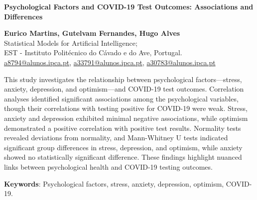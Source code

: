 \documentclass[a4paper]{article}
\begin{document}
\noindent
\textbf{Psychological Factors and COVID-19 Test Outcomes: Associations and Differences}\\
\vspace{0.1em} 
\noindent\hrulefill 
\vspace{0.8em} 

\begin{center}
    \textbf{Eurico Martins, Gutelvam Fernandes, Hugo Alves}\\
    \vspace{0.5em}
    Statistical Models for Artificial Intelligence;\\
		EST - Instituto Politécnico do Cávado e do Ave, Portugal.\\
    \vspace{0.5em}
    \href{mailto:a8794@alunos.ipca.pt}{a8794@alunos.ipca.pt}, \href{mailto:a33791@alunos.ipca.pt}{a33791@alunos.ipca.pt}, \href{mailto:a30783@alunos.ipca.pt}{a30783@alunos.ipca.pt}
\end{center}

\vspace{3em}
\vspace{1em}\newline
This study investigates the relationship between psychological factors—stress, anxiety, depression, and optimism—and COVID-19 test outcomes.
Correlation analyses identified significant associations among the psychological variables, though their correlations with testing positive for COVID-19 were weak.
Stress, anxiety and depression exhibited minimal negative associations, while optimism demonstrated a positive correlation with positive test results.
Normality tests revealed deviations from normality, and Mann-Whitney U tests indicated significant group differences in stress, depression, and optimism,
while anxiety showed no statistically significant difference. These findings highlight nuanced links between psychological health and COVID-19 testing outcomes.

\vspace{1em}
\textbf{Keywords}: Psychological factors, stress, anxiety, depression, optimism, COVID-19.

\vspace{2em}
\end{document}
